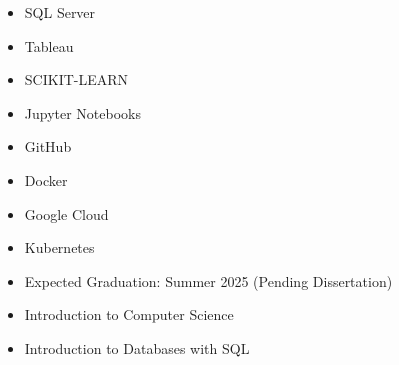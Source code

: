 \documentclass[10pt,a4paper,ragged2e,withhyper]{altacv}
\begin{document}
\begin{paracol}{2}
\begin{itemize}
  \item SQL Server
  \item Tableau
\end{itemize}

\begin{itemize}
  \item SCIKIT-LEARN
  \item Jupyter Notebooks
\end{itemize}

\begin{itemize}
  \item GitHub
  \item Docker
  \item Google Cloud
  \item Kubernetes
\end{itemize}






\endgroup



\switchcolumn

\begin{itemize}
  \item Expected Graduation: Summer 2025 (Pending Dissertation)
\end{itemize}
\begin{itemize}
  \item Introduction to Computer Science
  \item Introduction to Databases with SQL
\end{itemize}


\end{paracol}
\end{document}
